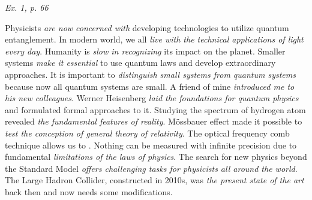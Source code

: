 \documentclass[a4paper, 12pt]{article}
\def\task#1{\begin{center}\it #1\end{center}}
\newif\ifcols
\begin{document}
\task{Ex. 1, p. 66}
\ifcols\begin{multicols}{2}\fi%

Physicists \emph{are now concerned with} developing technologies to utilize 
quantum entanglement. In modern world, we all \emph{live with the technical 
applications of light every day}. Humanity is \emph{slow in recognizing} its 
impact on the planet. Smaller systems \emph{make it essential} to use quantum 
laws and develop extraordinary approaches. It is important to 
\emph{distinguish small systems from quantum systems} because now all 
quantum systems are small. A friend of mine \emph{introduced me to his new 
colleagues}. Werner Heisenberg \emph{laid the foundations for quantum physics} 
and formulated formal approaches to it. Studying the spectrum of hydrogen atom 
revealed \emph{the fundamental features of reality}. M\"ossbauer effect made it 
possible to \emph{test the conception of general theory of relativity}. The 
optical frequency comb technique allows us to . Nothing can be measured with infinite 
precision due to fundamental \emph{limitations of the laws of physics}. The 
search for new physics beyond the Standard Model \emph{offers challenging tasks 
for physicists all around the world}. The Large Hadron Collider, constructed in 
2010s, was \emph{the present state of the art} back then and now needs some 
modifications.
\ifcols\end{multicols}\fi%
\end{document}
